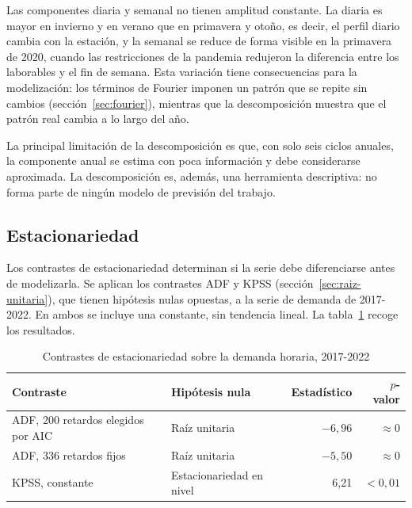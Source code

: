 Las componentes diaria y semanal no tienen amplitud constante. La diaria es
mayor en invierno y en verano que en primavera y otoño, es decir, el perfil
diario cambia con la estación, y la semanal se reduce de forma visible en la
primavera de 2020, cuando las restricciones de la pandemia redujeron la
diferencia entre los laborables y el fin de semana. Esta variación tiene
consecuencias para la modelización: los términos de Fourier imponen un
patrón que se repite sin cambios (sección~\ref{sec:fourier}), mientras que
la descomposición muestra que el patrón real cambia a lo largo del año.

La principal limitación de la descomposición es que, con solo seis ciclos
anuales, la componente anual se estima con poca información y debe
considerarse aproximada. La descomposición es, además, una herramienta
descriptiva: no forma parte de ningún modelo de previsión del trabajo.

\subsection{Estacionariedad}\label{sec:explo-estacionariedad}

Los contrastes de estacionariedad determinan si la serie debe diferenciarse
antes de modelizarla. Se aplican los contrastes ADF y KPSS
(sección~\ref{sec:raiz-unitaria}), que tienen hipótesis nulas opuestas, a la
serie de demanda de 2017-2022. En ambos se incluye una constante, sin
tendencia lineal. La tabla~\ref{tab:estacionariedad} recoge los resultados.

\begin{table}[htbp]
	\centering
	\caption{Contrastes de estacionariedad sobre la demanda horaria, 2017-2022}
	\label{tab:estacionariedad}
	\small
	\begin{tabularx}{\textwidth}{>{\raggedright\arraybackslash}p{4.2cm} >{\raggedright\arraybackslash}X r r}
		\hline
		\textbf{Contraste} & \textbf{Hipótesis nula} & \textbf{Estadístico} & \textbf{$p$-valor} \\
		\hline
		ADF, 200 retardos elegidos por AIC & Raíz unitaria & $-6{,}96$ & $\approx 0$ \\
		ADF, 336 retardos fijos & Raíz unitaria & $-5{,}50$ & $\approx 0$ \\
		KPSS, constante & Estacionariedad en nivel & 6,21 & $< 0{,}01$ \\
		\hline
	\end{tabularx}
\end{table}

